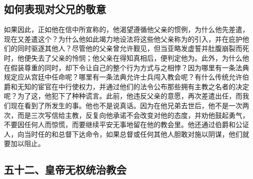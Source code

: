 
\subsection{如何表现对父兄的敬意}

如果因此，正如他在信中所宣称的，他渴望遵循他父亲的惯例，为什么他先差遣，现在又差遣这个？为什么他如此竭力地设法将这些他父亲称为的引入，并在庇护他们的同时驱逐其他人？尽管他的父亲曾允许觐见，但当亚略发虚誓并肚腹崩裂而死时，他便失去了父亲的怜悯；他父亲在得知真相后，便判定他为。此外，为什么他在假装尊重的同时，却下令让自己的整个行为方式与之相悖？因为哪里有一条法典规定应从宫廷中任命呢？哪里有一条法典允许士兵闯入教会呢？有什么传统允许伯爵和无知的宦官在中行使权力，并通过他们的法令公布那些拥有主教之名者的决定呢？为了这，他犯下了种种谎言。此前，他违反父亲的意愿，再次差遣出任，而我们现在看到了所发生的事。他也不是说真话。因为在他兄弟去世后，他不是一次两次，而是三次写信给主教，反复向他承诺不会改变对他的态度，并劝他鼓起勇气，不要因任何人而惊慌，而要继续平安无事地留在他的教会里。他还通过伯爵和公证人，向当时任的和总督下达命令，如果总督或任何其他人胆敢对施以阴谋，他们就要加以阻止。\par


\subsection{五十二、皇帝无权统治教会}

